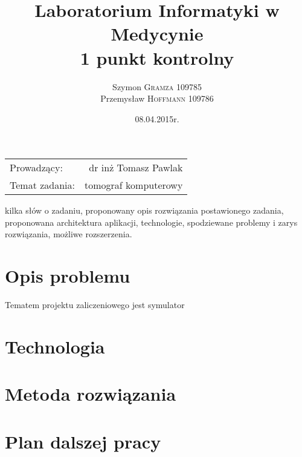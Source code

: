 \documentclass[A_4paper,12pt]{article}
\title{Laboratorium Informatyki w Medycynie \\ 1 punkt kontrolny} %
\author{Szymon \textsc{Gramza} 109785  \\ Przemysław \textsc{Hoffmann} 109786} %
\date{08.04.2015r.} %
\begin{document}
\maketitle %

\begin{center}
\begin{tabular}{l r}
Prowadzący: & dr inż Tomasz Pawlak \\
Temat zadania: & tomograf komputerowy
\end{tabular}
\end{center}

\newpage
 kilka słów o zadaniu, proponowany opis rozwiązania postawionego zadania, 
 proponowana architektura aplikacji, technologie, 
 spodziewane problemy i zarys rozwiązania, możliwe rozszerzenia.
\section{Opis problemu}
Tematem projektu zaliczeniowego jest symulator 

\section{Technologia}
\section{Metoda rozwiązania}
\section{Plan dalszej pracy}




\end{document}
